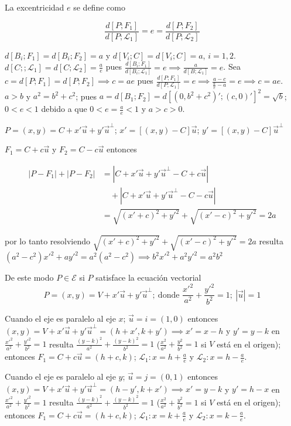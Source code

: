 \documentclass[12pt,]{report}
\theoremstyle{slplain}
\begin{document}
La excentricidad \(e\) se define como

\[\frac{d\left[P;F_1\right]}{d\left[P;\mathcal{L}_1\right]}=e=\frac{d\left[P;F_2\right]}{d\left[P;\mathcal{L}_2\right]}\]

\(d\left[B_i;F_1\right]=d\left[B_i;F_2\right]= a\) y \(d\left[V_i;C\right]=d\left[V_i;C\right]=a\), \(i=1,2\). \(d\left[C;;\mathcal{L}_1\right]=d\left[C;\mathcal{L}_2\right]=\frac{a}{e}\) pues \(\frac{d\left[B_i;F_1\right]}{d\left[B_i;\mathcal{L}_1\right]}=e\implies \frac{a}{d\left[B;\mathcal{L}_1\right]}=e\). Sea \(c=d\left[P;F_1\right]=d\left[P;F_2\right]\implies c=ae\) pues \(\frac{d\left[P;F_1\right]}{d\left[P;\mathcal{L}_1\right]}=e\implies \frac{a-c}{\frac{a}{e}-a}=e \implies c=ae\). \(a>b\) y \(a^2=b^2+c^2\); pues \(a=d\left[B_1;F_2\right]=d\left[(0,b^2+c^2)';(c,0)'\right]^2=\sqrt{b}\); \(0<e<1\) debido a que \(0<e=\frac{a}{e}<1\) y \(a>c>0\).

\(P=(x,y)=C+x'\vec{u}+y'\vec{u}^\perp\); \(x'=[(x,y)-C]\vec{u}\); \(y'=[(x,y)-C]\vec{u}^\perp\)

\(F_1=C+c\vec{u}\) y \(F_2=C-c\vec{u}\) entonces

\begin{align*}
\left|P-F_1\right|+\left|P-F_2\right|&=\left|C+x'\vec{u}+y'\vec{u}^\perp-C+c\vec{u}\right|\\
&\quad+\left|C+x'\vec{u}+y'\vec{u}^\perp-C-c\vec{u}\right|\\
&=\sqrt{(x'+c)^2+y'^2}+\sqrt{(x'-c)^2+y'^2}=2a\end{align*}

por lo tanto resolviendo \(\sqrt{(x'+c)^2+y'^2}+\sqrt{(x'-c)^2+y'^2}=2a\) resulta \((a^2-c^2)x'^2+ay'^2=a^2(a^2-c^2)\implies b^2x'^2+a^2y'^2=a^2b^2\)

De este modo \(P\in\mathcal{E}\) si \(P\) satisface la ecuación vectorial \[P=(x,y)=V+x'\vec{u}+y'\vec{u}^\perp;\: \text{donde } \frac{x'^2}{a^2}+\frac{y'^2}{b^2}=1; \:\left|\vec{u}\right|=1\]

Cuando el eje es paralelo al eje \(x\); \(\vec{u}=i=(1,0)\) entonces \((x,y)=V+x'\vec{u}+y'\vec{u}^\perp=(h+x',k+y')\implies x'=x-h\) y \(y'=y-k\) en \(\frac{x'^2}{a^2}+\frac{y'^2}{b^2}=1\) resulta \(\frac{(y-k)^2}{a^2}+\frac{(y-k)^2}{b^2}=1\) (\(\frac{x^2}{a^2}+\frac{y^2}{b^2}=1\) si \(V\) está en el origen); entonces \(F_1=C+c\vec{u}=(h+c,k)\); \(\mathcal{L}_1: x=h+\frac{a}{e}\) y \(\mathcal{L}_2: x=h-\frac{a}{e}\).

Cuando el eje es paralelo al eje \(y\); \(\vec{u}=j=(0,1)\) entonces \((x,y)=V+x'\vec{u}+y'\vec{u}^\perp=(h-y',k+x')\implies x'=y-k\) y \(y'=h-x\) en \(\frac{x'^2}{a^2}+\frac{y'^2}{b^2}=1\) resulta \(\frac{(y-k)^2}{a^2}+\frac{(y-k)^2}{b^2}=1\) (\(\frac{x^2}{a^2}+\frac{y^2}{b^2}=1\) si \(V\) está en el origen); entonces \(F_1=C+c\vec{u}=(h+c,k)\); \(\mathcal{L}_1: x=k+\frac{a}{e}\) y \(\mathcal{L}_2: x=k-\frac{a}{e}\).
\end{document}

